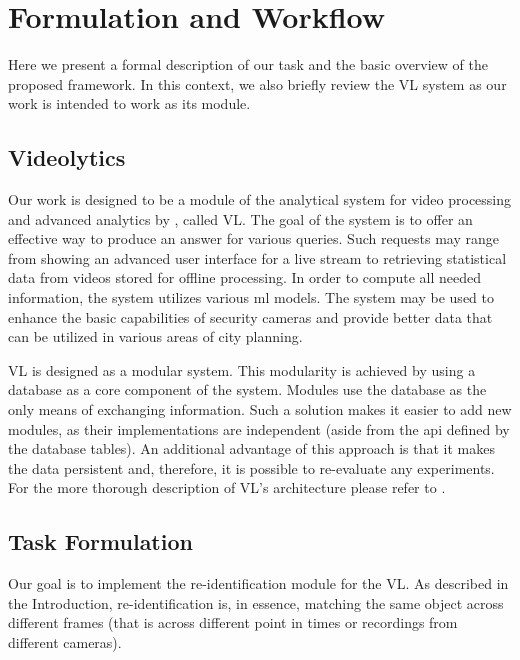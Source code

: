 \chapter{Formulation and Workflow}

\label{ch:workflow}

Here we present a formal description of our task and the basic overview of the proposed framework. In this context, we also briefly review the \gls{VL} system as our work is intended to work as its module.

\section{Videolytics}

\label{sec:vl}

Our work is designed to be a module of the analytical system for video processing and advanced analytics by \cite{videolytics}, called \gls{VL}. The goal of the system is to offer an effective way to produce an answer for various queries. Such requests may range from showing an advanced user interface for a live stream to retrieving statistical data from videos stored for offline processing. In order to compute all needed information, the system utilizes various \gls{ml} models. The system may be used to enhance the basic capabilities of security cameras and provide better data that can be utilized in various areas of city planning.

\Gls{VL} is designed as a modular system. This modularity is achieved by using a database as a core component of the system. Modules use the database as the only means of exchanging information. Such a solution makes it easier to add new modules, as their implementations are independent (aside from the \gls{api} defined by the database tables). An additional advantage of this approach is that it makes the data persistent and, therefore, it is possible to re-evaluate any experiments. For the more thorough description of \gls{VL}'s architecture please refer to \cite{videolyticsarch}. 

\section{Task Formulation}

Our goal is to implement the re-identification module for the \gls{VL}. As described in the Introduction, re-identification is, in essence, matching the same object across different frames (that is across different point in times or recordings from different cameras).

